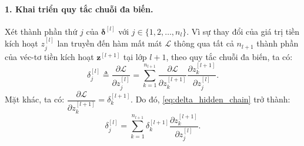 \paragraph{1. Khai triển quy tắc chuỗi đa biến.\\}
Xét thành phần thứ $j$ của $\boldsymbol{\delta}^{[l]}$ với $j \in \{1, 2, \dots, n_l\}$. Vì sự thay đổi của giá trị tiền kích hoạt $z_j^{[l]}$ lan truyền đến hàm mất mát $\mathcal{L}$ thông qua tất cả $n_{l+1}$ thành phần của véc-tơ tiền kích hoạt $\mathbf{z}^{[l+1]}$ tại lớp $l+1$, theo quy tắc chuỗi đa biến, ta có:
\begin{equation}
\delta_j^{[l]} \triangleq \frac{\partial\mathcal{L}}{\partial z_j^{[l]}} = \sum_{k=1}^{n_{l+1}} \frac{\partial\mathcal{L}}{\partial z_k^{[l+1]}} \frac{\partial z_k^{[l+1]}}{\partial z_j^{[l]}}.
\label{eq:delta_hidden_chain}
\end{equation}
Mặt khác, ta có: $\dfrac{\partial\mathcal{L}}{\partial z_k^{[l+1]}} = \delta_k^{[l+1]}$. Do đó, \eqref{eq:delta_hidden_chain} trở thành:
\begin{equation}
\delta_j^{[l]} = \sum_{k=1}^{n_{l+1}} \delta_k^{[l+1]} \frac{\partial z_k^{[l+1]}}{\partial z_j^{[l]}}.
\label{eq:delta_hidden_sub}
\end{equation}

